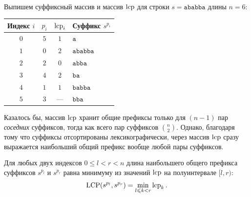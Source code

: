 \begin{example}
    Выпишем суффиксный массив и массив $\operatorname{lcp}$ для строки $s = \mathtt{ababba}$ длины $n = 6$:
    \begin{center}
    \begin{tabular}{@{}cccl@{}}
        \toprule
        Индекс $i$ & $p_i$ & $\operatorname{lcp}_i$ & Суффикс $s^{p_i}$ \\
        \midrule
        $0$ & $5$ & $1$ & $\mathtt{a}$ \\
        $1$ & $0$ & $2$ & $\mathtt{ababba}$ \\
        $2$ & $2$ & $0$ & $\mathtt{abba}$ \\
        $3$ & $4$ & $2$ & $\mathtt{ba}$ \\
        $4$ & $1$ & $1$ & $\mathtt{babba}$ \\
        $5$ & $3$ & --- & $\mathtt{bba}$ \\
        \bottomrule
    \end{tabular}
    \end{center}
\end{example}

Казалось бы, массив $\operatorname{lcp}$ хранит общие префиксы только для $(n-1)$ пар \emph{соседних} суффиксов, тогда как всего пар суффиксов $\binom{n}{2}$. Однако, благодаря тому что суффиксы отсортированы лексикографически, через массив $\operatorname{lcp}$ сразу выражается наибольший общий префикс вообще любой пары суффиксов.

\begin{lemma}\label{lem:lcp_min}
    Для любых двух индексов $0 \le l < r < n$ длина наибольшего общего префикса суффиксов $s^{p_l}$ и $s^{p_r}$ равна минимуму из значений $\operatorname{lcp}$ на полуинтервале $[l, r)$:
    \[
        \operatorname{LCP}(s^{p_l}, s^{p_r}) = \min_{l \leqslant k < r} \operatorname{lcp}_k.
    \]
\end{lemma}

